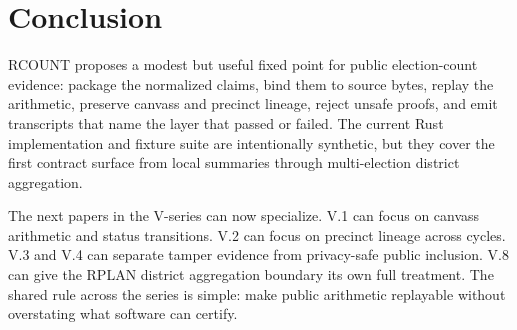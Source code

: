 \section{Conclusion}

RCOUNT proposes a modest but useful fixed point for public election-count
evidence: package the normalized claims, bind them to source bytes, replay the
arithmetic, preserve canvass and precinct lineage, reject unsafe proofs, and
emit transcripts that name the layer that passed or failed. The current Rust
implementation and fixture suite are intentionally synthetic, but they cover the
first contract surface from local summaries through multi-election district
aggregation.

The next papers in the V-series can now specialize. V.1 can focus on canvass
arithmetic and status transitions. V.2 can focus on precinct lineage across
cycles. V.3 and V.4 can separate tamper evidence from privacy-safe public
inclusion. V.8 can give the RPLAN district aggregation boundary its own full
treatment. The shared rule across the series is simple: make public arithmetic
replayable without overstating what software can certify.

